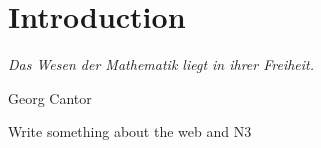 \chapter{Introduction}
\setlength{\epigraphrule}{0pt}
\setlength{\epigraphwidth}{0.75\textwidth}
\epigraph{\textit{Das Wesen der Mathematik liegt in ihrer Freiheit.}}{Georg Cantor}

Write something about the web and N3